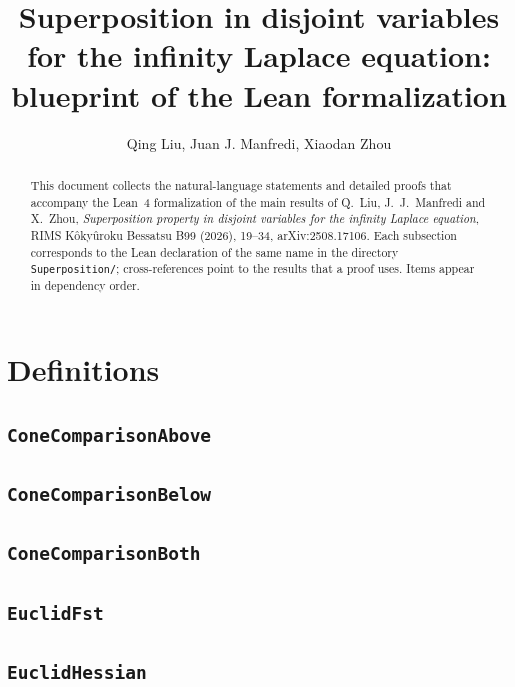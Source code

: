 \documentclass[11pt]{amsart}
\title[Blueprint of the Lean formalization]{Superposition in disjoint variables for the infinity Laplace equation: blueprint of the Lean formalization}
\author{Qing Liu, Juan J. Manfredi, Xiaodan Zhou}
\theoremstyle{definition}
\begin{document}
\begin{abstract}
This document collects the natural-language statements and detailed proofs that accompany the Lean~4 formalization of the main results of
Q.~Liu, J.~J.~Manfredi and X.~Zhou, \emph{Superposition property in disjoint variables for the infinity Laplace equation}, RIMS K\^oky\^uroku Bessatsu B99 (2026), 19--34, arXiv:2508.17106.
Each subsection corresponds to the Lean declaration of the same name in the directory \texttt{Superposition/}; cross-references point to the results that a proof uses.
Items appear in dependency order.
\end{abstract}
\maketitle
\tableofcontents

\section{Definitions}
\subsection{\texorpdfstring{\texttt{ConeComparisonAbove}}{ConeComparisonAbove}}\label{node:ConeComparisonAbove}


\subsection{\texorpdfstring{\texttt{ConeComparisonBelow}}{ConeComparisonBelow}}\label{node:ConeComparisonBelow}


\subsection{\texorpdfstring{\texttt{ConeComparisonBoth}}{ConeComparisonBoth}}\label{node:ConeComparisonBoth}


\subsection{\texorpdfstring{\texttt{EuclidFst}}{EuclidFst}}\label{node:EuclidFst}


\subsection{\texorpdfstring{\texttt{EuclidHessian}}{EuclidHessian}}\label{node:EuclidHessian}

\end{document}
